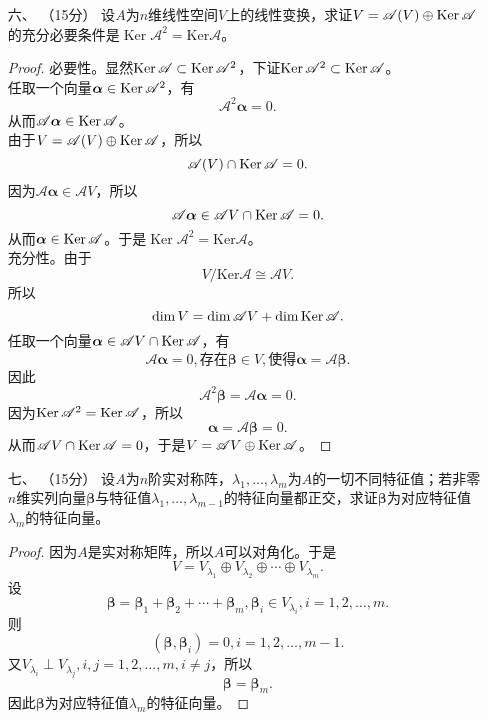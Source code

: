 \begin{enumerate}[1~]
\item[六、]（15分）
设$A$为$n$维线性空间$V$上的线性变换，求证$V =\mathscr{A}(V)\oplus \operatorname{Ker} \mathscr{A}$的充分必要条件是$\operatorname { Ker } \mathscr{A} ^ { 2 } = \mathrm { Ker } \mathscr{A}$。
\begin{proof}
必要性。显然$\operatorname{Ker} \mathscr{A} \subset \operatorname{Ker} \mathscr{A}^2$，下证$\operatorname{Ker} \mathscr{A}^2 \subset \operatorname{Ker} \mathscr{A}$。\\
任取一个向量$\boldsymbol{\alpha}\in\operatorname{Ker}\mathscr{A}^2$，有\[
\mathscr{A}^2\boldsymbol{\alpha}=0.
\]
从而$\mathscr{A}\boldsymbol{\alpha}\in\operatorname{Ker}\mathscr{A}$。\\
由于$V=\mathscr{A}(V)\oplus \operatorname{Ker} \mathscr{A}$，所以\[
\mathscr{A}(V)\cap \operatorname{Ker} \mathscr{A}=0.
\]
因为$\mathscr{A}\boldsymbol{\alpha}\in\mathscr{A}V$，所以\[
\mathscr{A}\boldsymbol{\alpha}\in\mathscr{A}V \cap \operatorname{Ker}\mathscr{A}=0.
\]
从而$\boldsymbol{\alpha}\in\operatorname{Ker}\mathscr{A}$。于是$\operatorname { Ker } \mathscr{A} ^ { 2 } = \mathrm { Ker } \mathscr{A}$。\\
充分性。由于\[
V / \mathrm { Ker } \mathscr { A } \cong  \mathscr { A }V.
\]
所以\[
\dim V=\dim \mathscr{A}V+\dim\operatorname{Ker}\mathscr{A}.
\]
任取一个向量$\boldsymbol{\alpha}\in\mathscr{A}V\cap\operatorname{Ker}\mathscr{A}$，有\[
\mathscr{A}\boldsymbol{\alpha}=0, \text{存在}\boldsymbol{\beta}\in V, \text{使得} \boldsymbol{\alpha}=\mathscr{A}\boldsymbol{\beta}.
\]
因此\[
\mathscr{A}^2\boldsymbol{\beta}=\mathscr{A}\boldsymbol{\alpha}=0.
\]
因为$\operatorname{Ker}\mathscr{A}^2=\operatorname{Ker}\mathscr{A}$，所以\[
\boldsymbol{\alpha}=\mathscr{A}\boldsymbol{\beta}=0.
\]
从而$\mathscr{A}V\cap\operatorname{Ker}\mathscr{A}=0$，于是$V=\mathscr{A}V\oplus\operatorname{Ker}\mathscr{A}$。
\end{proof}

\item[七、]（15分）
设$A$为$n$阶实对称阵，$\lambda _ { 1 } , \dots , \lambda _ {  { m } }$为$A$的一切不同特征值；若非零$n$维实列向量$\boldsymbol{\beta}$与特征值$\lambda _ { 1 } , \dots , \lambda _ {  { m } - 1 }$的特征向量都正交，求证$\boldsymbol{\beta}$为对应特征值$\lambda_m$的特征向量。
\begin{proof}
因为$A$是实对称矩阵，所以$A$可以对角化。于是
\[
V=V_{\lambda_{1}}\oplus V_{\lambda_{2}}\oplus\cdots\oplus V_{\lambda_{m}}.
\]
设\[
\boldsymbol{\beta}=\boldsymbol{\beta}_1+\boldsymbol{\beta}_2+\cdots+\boldsymbol{\beta}_m, \boldsymbol{\beta}_i\in V_{\lambda_{i}}, i=1, 2, \dots, m.
\]
则\[
(\boldsymbol{\beta}, \boldsymbol{\beta}_i)=0, i=1, 2, \dots, m-1.
\]
又$V_{\lambda_{i}}\perp V_{\lambda_{j}}, i, j=1, 2, \dots, m, i\ne j$，所以\[
\boldsymbol{\beta}=\boldsymbol{\beta}_m.
\]
因此$\boldsymbol{\beta}$为对应特征值$\lambda_m$的特征向量。
\end{proof}


\end{enumerate}
